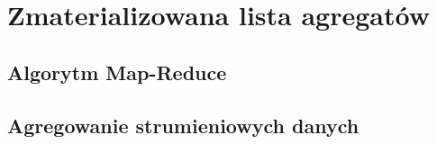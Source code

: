 \section{Zmaterializowana lista agregatów}

\subsection{Algorytm Map-Reduce}



\subsection{Agregowanie strumieniowych danych}
